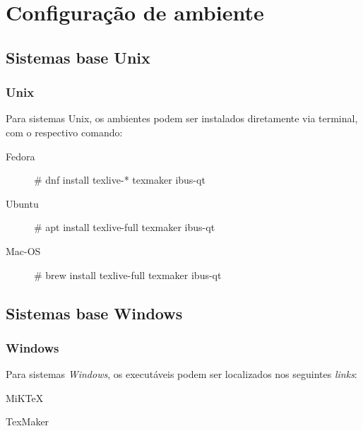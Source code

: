 \section{Configuração de ambiente} %
\label{sec:configura_o_de_ambiente}

\subsection{Sistemas base Unix} %
\label{sub:sistemas_base_unix}

\begin{frame}[fragile]
	\frametitle{Unix}

	Para sistemas Unix, os ambientes podem ser instalados diretamente via terminal, com o respectivo comando:

	\begin{description}
		\item [Fedora] {\code \# dnf install texlive-* texmaker ibus-qt}
		\item [Ubuntu] {\code \# apt install texlive-full texmaker ibus-qt}
		\item [Mac-OS] {\code \# brew install texlive-full texmaker ibus-qt}
	\end{description}

\end{frame}

\subsection{Sistemas base Windows} %
\begin{frame}[fragile]
	\frametitle{Windows}

	Para sistemas {\it Windows}, os executáveis podem ser localizados nos seguintes {\it links}:

	\begin{description}
		\item [MiKTeX] \href{http://ctan.sharelatex.com/tex-archive/systems/win32/miktex/}{ }
		\item [TexMaker] \href{http://www.xm1math.net/texmaker/download.html#windows}{ }
	\end{description}

\end{frame}

